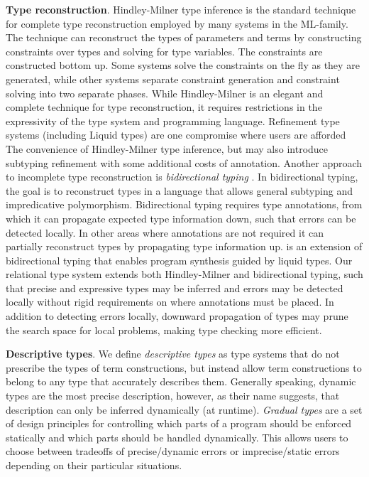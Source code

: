 \documentclass[sigplan]{acmart}
\theoremstyle{definition}
\begin{document}
\noindent
\textbf{Type reconstruction}.
Hindley-Milner type inference \cite[?]{} is the standard technique for complete type reconstruction employed
by many systems in the ML-family. The technique can reconstruct the types of parameters 
and terms by constructing constraints over types and solving for type variables. 
The constraints are constructed bottom up. Some systems solve the constraints on the fly  
as they are generated, while other systems separate constraint generation and constraint
solving into two separate phases. 
While Hindley-Milner is an elegant and complete technique for type reconstruction, it requires
restrictions in the expressivity of the type system and programming language.
Refinement type systems \cite[?]{} (including Liquid types) are one compromise where users are afforded
The convenience of Hindley-Milner type inference, but may also introduce subtyping refinement
with some additional costs of annotation.
Another approach to incomplete type reconstruction is \textit{bidirectional typing} \cite[?]{}.
In bidirectional typing, the goal is to reconstruct types in a language that allows general subtyping 
and impredicative polymorphism. Bidirectional typing requires type annotations, from which it can 
propagate expected type information down, such that errors can be detected locally. 
In other areas where annotations are not required it can partially
reconstruct types by propagating type information up.  \cite[?]{} is an extension of 
bidirectional typing that enables program synthesis guided by liquid types. 
Our relational type system extends both Hindley-Milner and bidirectional typing, 
such that precise and expressive types may be inferred and errors may be detected locally
without rigid requirements on where annotations must be placed. In addition to detecting errors locally, 
downward propagation of types may prune the search space for local problems, 
making type checking more efficient. 
\newline


\noindent
\textbf{Descriptive types}. We define \textit{descriptive types} as 
type systems that do not prescribe the types of term constructions, but instead allow  
term constructions to belong to any type that accurately describes them. 
Generally speaking, dynamic types are the most precise description, however,
as their name suggests, that description can only be inferred dynamically (at runtime).
\textit{Gradual types} are a set of design principles for controlling which parts of a program
should be enforced statically and which parts should be handled dynamically. 
This allows users to choose between tradeoffs of precise/dynamic errors or  
imprecise/static errors depending on their particular situations.
\end{document}
